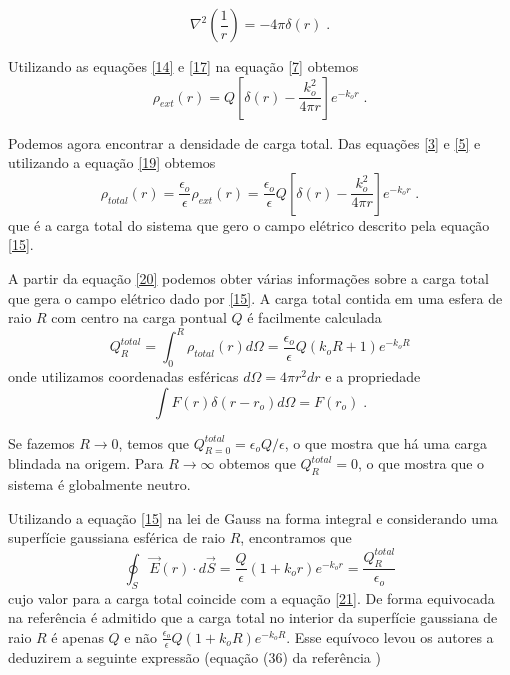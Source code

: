 \documentclass[brazilian,10.7pt,a4paper]{article}
\begin{document}
\begin{equation}\label{18}
\nabla^{2}\left(\frac{1}{r}\right)=-4\pi\delta(r)\;.
\end{equation}
\par Utilizando as equações \eqref{14} e \eqref{17} na equação \eqref{7} obtemos
\\
\begin{equation}\label{19}
\rho_{ext}(r)=Q[\delta(r)-\frac{k^{2}_{o}}{4\pi r}]e^{-k_{o}r}\;.
\end{equation}
\par Podemos agora encontrar a densidade de carga total. Das equações \eqref{3} e \eqref{5} e utilizando a equação \eqref{19} obtemos
\\
\begin{equation}\label{20}
\rho_{total}(r)=\frac{\epsilon_{o}}{\epsilon}\rho_{ext}(r)=\frac{\epsilon_{o}}{\epsilon}Q[\delta(r)-\frac{k^{2}_{o}}{4\pi r}]e^{-k_{o}r}\;.
\end{equation}
que é a carga total do sistema que gero o campo elétrico descrito pela equação \eqref{15}.
\par A partir da equação \eqref{20} podemos obter várias informações sobre a carga total que gera o campo elétrico dado por \eqref{15}. A carga total contida em uma esfera de raio $R$ com centro na carga pontual $Q$ é facilmente calculada
\\
\begin{equation}\label{21}
Q^{total}_{R}=\int^{R}_{0}\rho_{total}(r)d\Omega=\frac{\epsilon_{o}}{\epsilon}Q(k_{o}R+1)e^{-k_{o}R}
\end{equation}
onde utilizamos coordenadas esféricas $d\Omega=4\pi r^{2}dr$ e a propriedade
\\
$$\int{F(r)\delta(r-r_{o})d\Omega}=F(r_{o})\;.$$ %
\par Se fazemos $R\rightarrow 0$, temos que $Q^{total}_{R=0} = \epsilon_{o}Q/\epsilon$, o que mostra que há uma carga blindada na origem. Para $R \rightarrow \infty$ obtemos que $Q^{total}_{R}=0$, o que mostra que o sistema é globalmente neutro.
\par Utilizando a equação \eqref{15} na lei de Gauss na forma integral e considerando uma superfície gaussiana esférica de raio $R$, encontramos que
\\
\begin{equation}\label{22}
\oint_{S}{\vec{E}(r)\cdot d\vec{S}}=\frac{Q}{\epsilon}(1+k_{o}r)e^{-k_{o}r}=\frac{Q^{total}_{R}}{\epsilon_{o}}
\end{equation}
cujo valor para a carga total coincide com a equação \eqref{21}. De forma equivocada na referência \cite{ramos} é admitido que a carga total no interior da superfície gaussiana de raio $R$ é apenas $Q$ e não $\frac{\epsilon_{o}}{\epsilon}Q(1+k_{o}R)e^{-k_{o}R}$. Esse equívoco levou os autores a deduzirem a seguinte expressão (equação (36) da referência \cite{ramos})
\end{document}
